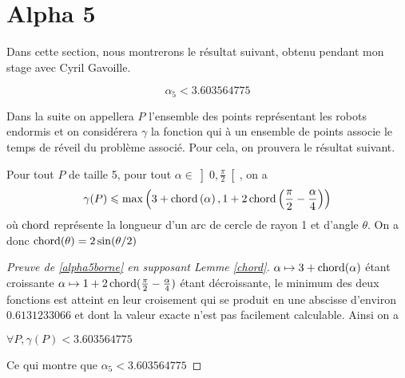 \section{Alpha 5}

Dans cette section, nous montrerons le résultat suivant, obtenu pendant mon stage avec Cyril Gavoille.

\begin{theorem}\label{alpha5borne}

$$\alpha_5 < 3.603564775$$

\end{theorem}

Dans la suite on appellera $P$ l'ensemble des points représentant les robots endormis et on considérera $\gamma$ la fonction qui à un ensemble de points associe le temps de réveil du problème associé. Pour cela, on prouvera le résultat suivant.

\begin{lemma}\label{chord}
Pour tout $P$ de taille 5, pour tout $\alpha \in \left]0, \frac{\pi}{2}\right[$, on a
$$\gamma(P) \leqslant \max\left(3 + \operatorname{chord}\left(\alpha\right), 1 + 2\operatorname{chord}\left(\frac{\pi}{2} - \frac{\alpha}{4}\right)\right)$$
où $\operatorname{chord}$ représente la longueur d'un arc de cercle de rayon 1 et d'angle $\theta$. On a donc $\operatorname{chord}(\theta) = 2\sin(\theta/2)$
\end{lemma}

\begin{proof}[Preuve de \ref{alpha5borne} en supposant Lemme \ref{chord}]

$\alpha \mapsto 3+\operatorname{chord}(\alpha)$ étant croissante $\alpha \mapsto 1 + 2\operatorname{chord}(\frac{\pi}{2} - \frac{\alpha}{4})$ étant décroissante, le minimum des deux fonctions est atteint en leur croisement qui se produit en une abscisse d'environ $0.6131233066$ et dont la valeur exacte n'est pas facilement calculable. Ainsi on a

\(\forall P, \gamma(P) < 3.603564775\)

Ce qui montre que $\alpha_5 < 3.603564775$

\end{proof}

